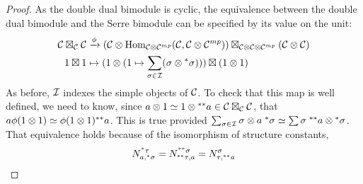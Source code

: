 \documentclass{amsart}
\begin{document}
\begin{proof}
As the double dual bimodule is cyclic, the equivalence between the double dual bimodule and the Serre bimodule can be specified by its value on the unit:
\begin{align}
\mathcal C \boxtimes_{\mathcal C} \mathcal C 
& \xrightarrow{\phi} 
(\mathcal C \otimes \operatorname{Hom}_{\mathcal C \otimes \mathcal C^{{mp}}}(\mathcal C, \mathcal C \otimes \mathcal C^{{mp}})) \boxtimes_{\mathcal C \otimes \mathcal C \otimes \mathcal C^{{mp}}} (\mathcal C \otimes \mathcal C) 
\nonumber\\
1 \boxtimes 1 
& \mapsto 
(1 \otimes (1 \mapsto \sum_{\sigma \in \mathcal I} (\sigma \otimes {}^*{\sigma}))) \boxtimes (1 \otimes 1)
\nonumber
\end{align}
As before, $\mathcal I$ indexes the simple objects of $\mathcal C$.  To check that this map is well defined, we need to know, since $a \otimes 1 \simeq 1 \otimes {}^{**}{a} \in \mathcal C \boxtimes_{\mathcal C} \mathcal C$, that $a \phi(1 \otimes 1) \simeq \phi(1 \otimes 1) {}^{**}{a}$.    This is true provided $\sum_{\sigma \in \mathcal I} \sigma \otimes a \; {}^*{\sigma} \simeq \sum \sigma \; {}^{**}{a} \otimes {}^*{\sigma}$.  That equivalence holds because of the isomorphism of structure constants,
\begin{equation} \nonumber
N^{{}^*{\tau}}_{a, {}^*{\sigma}} = N^{{}^{**}{\sigma}}_{{}^{**}{\tau}, a} = N^{\sigma}_{\tau, {}^{**}{a}}
\end{equation}



\end{proof}

\end{document}
